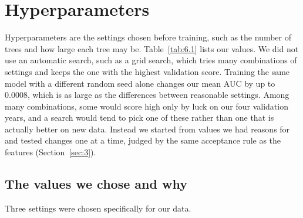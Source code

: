 \section{Hyperparameters}\label{sec:6}

Hyperparameters are the settings chosen before training, such as the number of trees and how large each tree may be. Table~\ref{tab:6.1} lists our values. We did not use an automatic search, such as a grid search, which tries many combinations of settings and keeps the one with the highest validation score. Training the same model with a different random seed alone changes our mean AUC by up to 0.0008, which is as large as the differences between reasonable settings. Among many combinations, some would score high only by luck on our four validation years, and a search would tend to pick one of these rather than one that is actually better on new data. Instead we started from values we had reasons for and tested changes one at a time, judged by the same acceptance rule as the features (Section~\ref{sec:3}).

\begin{table}[H]
  \centering\small
  \caption{The hyperparameters in the short notebooks}
  \label{tab:6.1}
\end{table}

\subsection{The values we chose and why}\label{sec:6.values}

Three settings were chosen specifically for our data.

